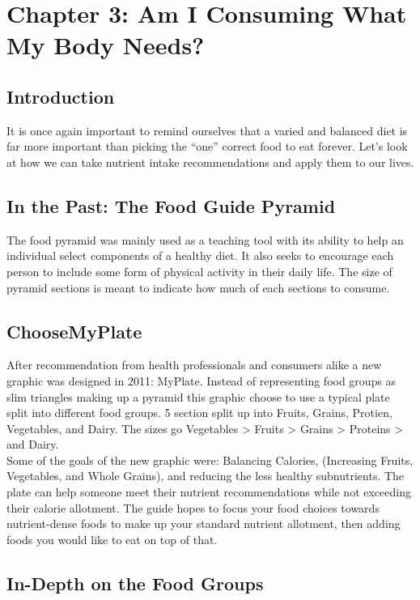 \documentclass[letterpaper, 11pt]{article}
\begin{document}
\section{Chapter 3: Am I Consuming What My Body Needs?}
\label{sec:orge43ed51}
\subsection{Introduction}
\label{sec:org246dd35}
It is once again important to remind ourselves that a varied and balanced diet is far more important than picking the ``one'' correct food to eat forever. Let's look at how we can take nutrient intake recommendations and apply them to our lives.\\
\subsection{In the Past: The Food Guide Pyramid}
\label{sec:orged37ef4}
The food pyramid was mainly used as a teaching tool with its ability to help an individual select components of a healthy diet. It also seeks to encourage each person to include some form of physical activity in their daily life. The size of pyramid sections is meant to indicate how much of each sections to consume.\\
\subsection{ChooseMyPlate}
\label{sec:orgf2e36cc}
After recommendation from health professionals and consumers alike a new graphic was designed in 2011: MyPlate. Instead of representing food groups as slim triangles making up a pyramid this graphic choose to use a typical plate split into different food groups. 5 section split up into Fruits, Grains, Protien, Vegetables, and Dairy. The sizes go Vegetables > Fruits > Grains >  Proteins > and Dairy.\\
Some of the goals of the new graphic were: Balancing Calories, (Increasing Fruits, Vegetables, and Whole Grains), and reducing the less healthy subnutrients. The plate can help someone meet their nutrient recommendations while not exceeding their calorie allotment. The guide hopes to focus your food choices towards nutrient-dense foods to make up your standard nutrient allotment, then adding foods you would like to eat on top of that.\\
\subsection{In-Depth on the Food Groups}
\label{sec:orgfcaaf62}
\end{document}
